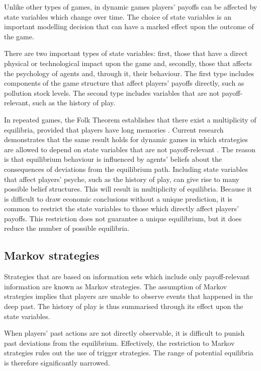 \label{sec:state-variables} Unlike other types of games, in dynamic games
players' payoffs can be affected by state variables which change over time.
The choice of state variables is an important modelling decision that can
have a marked effect upon the outcome of the game.

There are two important types of state variables: first, those that have a
direct physical or technological impact upon the game and, secondly, those
that affects the psychology of agents and, through it, their behaviour. The
first type includes components of the game structure that affect players'
payoffs directly, such as pollution stock levels. The second type includes
variables that are not payoff-relevant, such as the history of play.

In repeated games, the Folk Theorem establishes that there exist a
multiplicity of equilibria, provided that players have long memories %
\citep{Fudenberg1986}. Current research demonstrates that the same result
holds for dynamic games in which strategies are allowed to depend on state
variables that are not payoff-relevant \citep{Haurie1987,Ausubel1989,Gul1986}
. The reason is that equilibrium behaviour is influenced by agents' beliefs
about the consequences of deviations from the equilibrium path. Including
state variables that affect players' psyche, such as the history of play,
can give rise to many possible belief structures. This will result in
multiplicity of equilibria. Because it is difficult to draw economic
conclusions without a unique prediction, it is common to restrict the state
variables to those which directly affect players' payoffs. This restriction
does not guarantee a unique equilibrium, but it does reduce the number of
possible equilibria.

\subsection{Markov strategies}

\label{sec:markov-strategies} Strategies that are based on information sets
which include only payoff-relevant information are known as Markov
strategies. The assumption of Markov strategies implies that players are
unable to observe events that happened in the deep past. The history of play
is thus summarised through its effect upon the state variables.

When players' past actions are not directly observable, it is difficult to
punish past deviations from the equilibrium. Effectively, the restriction to
Markov strategies rules out the use of trigger strategies. The range of
potential equilibria is therefore significantly narrowed.


